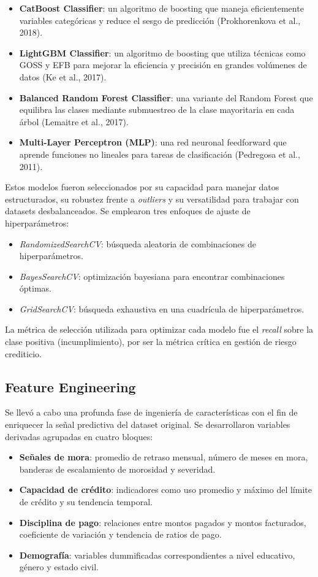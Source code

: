 \documentclass[journal]{apa7}
\begin{document}
\begin{itemize}
  \item \textbf{CatBoost Classifier}: un algoritmo de boosting que maneja eficientemente variables categóricas y reduce el sesgo de predicción (Prokhorenkova et al., 2018).
  \item \textbf{LightGBM Classifier}: un algoritmo de boosting que utiliza técnicas como GOSS y EFB para mejorar la eficiencia y precisión en grandes volúmenes de datos (Ke et al., 2017).
  \item \textbf{Balanced Random Forest Classifier}: una variante del Random Forest que equilibra las clases mediante submuestreo de la clase mayoritaria en cada árbol (Lemaitre et al., 2017).
  \item \textbf{Multi-Layer Perceptron (MLP)}: una red neuronal feedforward que aprende funciones no lineales para tareas de clasificación (Pedregosa et al., 2011).
\end{itemize}

Estos modelos fueron seleccionados por su capacidad para manejar datos estructurados, su robustez frente a \emph{outliers} y su versatilidad para trabajar con datasets desbalanceados. Se emplearon tres enfoques de ajuste de hiperparámetros:

\begin{itemize}
  \item \emph{RandomizedSearchCV}: búsqueda aleatoria de combinaciones de hiperparámetros.
  \item \emph{BayesSearchCV}: optimización bayesiana para encontrar combinaciones óptimas.
  \item \emph{GridSearchCV}: búsqueda exhaustiva en una cuadrícula de hiperparámetros.
\end{itemize}

La métrica de selección utilizada para optimizar cada modelo fue el \emph{recall} sobre la clase positiva (incumplimiento), por ser la métrica crítica en gestión de riesgo crediticio.

\subsection{Feature Engineering}

Se llevó a cabo una profunda fase de ingeniería de características con el fin de enriquecer la señal predictiva del dataset original. Se desarrollaron variables derivadas agrupadas en cuatro bloques:

\begin{itemize}
  \item \textbf{Señales de mora}: promedio de retraso mensual, número de meses en mora, banderas de escalamiento de morosidad y severidad.
  \item \textbf{Capacidad de crédito}: indicadores como uso promedio y máximo del límite de crédito y su tendencia temporal.
  \item \textbf{Disciplina de pago}: relaciones entre montos pagados y montos facturados, coeficiente de variación y tendencia de ratios de pago.
  \item \textbf{Demografía}: variables dummificadas correspondientes a nivel educativo, género y estado civil.
\end{itemize}
\end{document}
